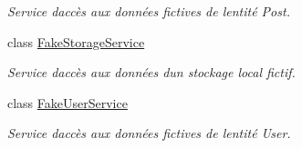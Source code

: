 \begin{DoxyCompactItemize}
\begin{DoxyCompactList}\small\item\em Service d\textquotesingle{}accès aux données fictives de l\textquotesingle{}entité Post. \end{DoxyCompactList}\item 
class \hyperlink{class_boxes_1_1_tests_1_1_mock_1_1_services_1_1_fake_storage_service}{Fake\+Storage\+Service}
\begin{DoxyCompactList}\small\item\em Service d\textquotesingle{}accès aux données d\textquotesingle{}un stockage local fictif. \end{DoxyCompactList}\item 
class \hyperlink{class_boxes_1_1_tests_1_1_mock_1_1_services_1_1_fake_user_service}{Fake\+User\+Service}
\begin{DoxyCompactList}\small\item\em Service d\textquotesingle{}accès aux données fictives de l\textquotesingle{}entité User. \end{DoxyCompactList}\end{DoxyCompactItemize}
